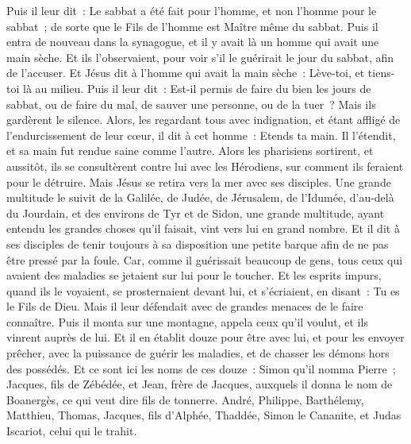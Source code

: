 \begin{multicols}{2}
Puis il leur dit~: Le sabbat a été fait pour l'homme, et non l'homme pour le sabbat~;
de sorte que le Fils de l'homme est Maître même du sabbat.
\VerseOne{}Puis il entra de nouveau dans la synagogue, et il y avait là un homme qui avait une main sèche.
Et ils l'observaient, pour voir s'il le guérirait le jour du sabbat, afin de l'accuser.
Et Jésus dit à l'homme qui avait la main sèche~: Lève-toi, et tiens-toi là au milieu.
Puis il leur dit~: Est-il permis de faire du bien les jours de sabbat, ou de faire du mal, de sauver une personne, ou de la tuer~? Mais ils gardèrent le silence.
Alors, les regardant tous avec indignation, et étant affligé de l'endurcissement de leur cœur, il dit à cet homme~: Etends ta main. Il l'étendit, et sa main fut rendue saine comme l'autre.
Alors les pharisiens sortirent, et aussitôt, ils se consultèrent contre lui avec les Hérodiens, sur comment ils feraient pour le détruire.
Mais Jésus se retira vers la mer avec ses disciples. Une grande multitude le suivit de la Galilée,
de Judée, de Jérusalem, de l'Idumée, d'au-delà du Jourdain, et des environs de Tyr et de Sidon, une grande multitude, ayant entendu les grandes choses qu'il faisait, vint vers lui en grand nombre.
Et il dit à ses disciples de tenir toujours à sa disposition une petite barque afin de ne pas être pressé par la foule.
Car, comme il guérissait beaucoup de gens, tous ceux qui avaient des maladies se jetaient sur lui pour le toucher.
Et les esprits impurs, quand ils le voyaient, se prosternaient devant lui, et s'écriaient, en disant~: Tu es le Fils de Dieu.
Mais il leur défendait avec de grandes menaces de le faire connaître.
Puis il monta sur une montagne, appela ceux qu'il voulut, et ils vinrent auprès de lui.
Et il en établit douze pour être avec lui,
et pour les envoyer prêcher, avec la puissance de guérir les maladies, et de chasser les démons hors des possédés.
Et ce sont ici les noms de ces douze~: Simon qu'il nomma Pierre~;
Jacques, fils de Zébédée, et Jean, frère de Jacques, auxquels il donna le nom de Boanergès, ce qui veut dire fils de tonnerre.
André, Philippe, Barthélemy, Matthieu, Thomas, Jacques, fils d'Alphée, Thaddée, Simon le Cananite,
et Judas Iscariot, celui qui le trahit.

\end{multicols}
